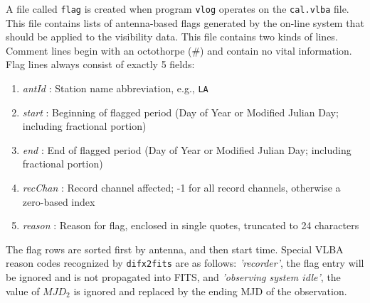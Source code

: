 A file called {\tt flag} is created when program {\tt vlog} operates on the {\tt cal.vlba} file.
This file contains lists of antenna-based flags generated by the on-line system that should be applied to the visibility data.
This file contains two kinds of lines.
Comment lines begin with an octothorpe (\#) and contain no vital information.
Flag lines always consist of exactly 5 fields:
\begin{enumerate}
\item {\em antId} : Station name abbreviation, e.g., {\tt LA}
\item {\em start} : Beginning of flagged period (Day of Year or Modified Julian Day; including fractional portion)
\item {\em end} : End of flagged period (Day of Year or Modified Julian Day; including fractional portion)
\item {\em recChan} : Record channel affected; -1 for all record channels, otherwise a zero-based index
\item {\em reason} : Reason for flag, enclosed in single quotes, truncated to 24 characters
\end{enumerate}
The flag rows are sorted first by antenna, and then start time.
Special VLBA reason codes recognized by {\tt difx2fits} are as follows: {\em 'recorder'}, the flag entry will be ignored and is not propagated into FITS, and {\em 'observing system idle'}, the value of $MJD_2$ is ignored and replaced by the ending MJD of the observation.


%
%







